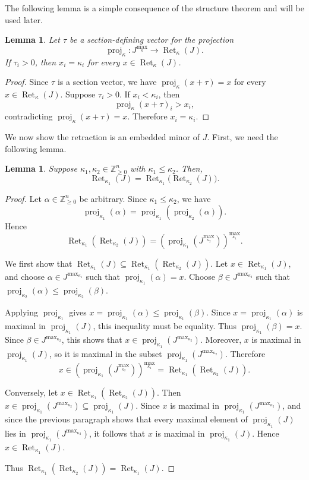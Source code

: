 \documentclass[10pt,a4paper]{amsart}
\newtheorem{lemma}[theorem]{Lemma}
\newcommand{\Zgeqn}{\mathbb{Z}_{\geq 0}^n}     %
\DeclareMathOperator{\proj}{proj}              %
\newcommand{\kproj}{\proj_{\kappa}}            %
\DeclareMathOperator{\Ret}{Ret}                %
\newcommand{\RetK}{\Ret_{\kappa}}              %
\newcommand{\Jmax}{J^{\max_{\kappa}}}
\begin{document}
The following lemma is a simple consequence of the structure theorem and will be used later. 
\begin{lemma}\label{lemma:section_vectors_saturate_coordinates}
    Let $\tau$ be a section-defining vector for the projection
    \[
        \kproj\colon \Jmax\to\RetK(J).
    \]
    If $\tau_i>0$, then $x_i=\kappa_i$ for every $x\in\RetK(J)$.
\end{lemma}

\begin{proof}
    Since $\tau$ is a section vector, we have $\kproj(x+\tau)=x$ for every $x\in\RetK(J)$. Suppose $\tau_i>0$. If $x_i<\kappa_i$, then
    \[
        \kproj(x+\tau)_i>x_i,
    \]
    contradicting $\kproj(x+\tau)=x$. Therefore $x_i=\kappa_i$.
\end{proof}

We now show the retraction is an embedded minor of $J$. First, we need the following lemma.

\begin{lemma}\label{lemma:retraction_of_retraction}
    Suppose $\kappa_1,\kappa_2 \in \Zgeqn$ with $\kappa_1 \leq \kappa_2$. Then, \[\Ret_{\kappa_1}(J) = \Ret_{\kappa_1}\big(\Ret_{\kappa_2}(J)\big).\]
\end{lemma}

\begin{proof}
Let $\alpha\in\Zgeqn$ be arbitrary. Since $\kappa_1\leq \kappa_2$, we have
\[
\proj_{\kappa_1}(\alpha)=\proj_{\kappa_1}(\proj_{\kappa_2}(\alpha)).
\] 
Hence
\[
\Ret_{\kappa_1}(\Ret_{\kappa_2}(J))
=
\left(\proj_{\kappa_1}(J^{\max_{\kappa_2}})\right)^{\max_{\kappa_1}}.
\]

We first show that $\Ret_{\kappa_1}(J)\subseteq \Ret_{\kappa_1}(\Ret_{\kappa_2}(J))$. Let $x\in \Ret_{\kappa_1}(J)$, and choose $\alpha\in J^{\max_{\kappa_1}}$ such that $\proj_{\kappa_1}(\alpha)=x$. Choose $\beta \in J^{\max_{\kappa_2}}$ such that $\proj_{\kappa_2}(\alpha) \leq \proj_{\kappa_2}(\beta)$.

Applying $\proj_{\kappa_1}$ gives $x=\proj_{\kappa_1}(\alpha)\leq \proj_{\kappa_1}(\beta)$. Since $x=\proj_{\kappa_1}(\alpha)$ is maximal in $\proj_{\kappa_1}(J)$, this inequality must be equality. Thus $\proj_{\kappa_1}(\beta)=x$. Since $\beta\in J^{\max_{\kappa_2}}$, this shows that $x\in \proj_{\kappa_1}(J^{\max_{\kappa_2}})$. Moreover, $x$ is maximal in $\proj_{\kappa_1}(J)$, so it is maximal in the subset $\proj_{\kappa_1}(J^{\max_{\kappa_2}})$. Therefore 
\[
x\in \left(\proj_{\kappa_1}(J^{\max_{\kappa_2}})\right)^{\max_{\kappa_1}}=\Ret_{\kappa_1}(\Ret_{\kappa_2}(J)).
\]

Conversely, let $x\in \Ret_{\kappa_1}(\Ret_{\kappa_2}(J))$. Then $x\in \proj_{\kappa_1}(J^{\max_{\kappa_2}})\subseteq \proj_{\kappa_1}(J)$. Since $x$ is maximal in $\proj_{\kappa_1}(J^{\max_{\kappa_2}})$, and since the previous paragraph shows that every maximal element of $\proj_{\kappa_1}(J)$ lies in $\proj_{\kappa_1}(J^{\max_{\kappa_2}})$, it follows that $x$ is maximal in $\proj_{\kappa_1}(J)$. Hence $x\in \Ret_{\kappa_1}(J)$.

Thus $\Ret_{\kappa_1}(\Ret_{\kappa_2}(J))=\Ret_{\kappa_1}(J)$.
\end{proof}
\end{document}
